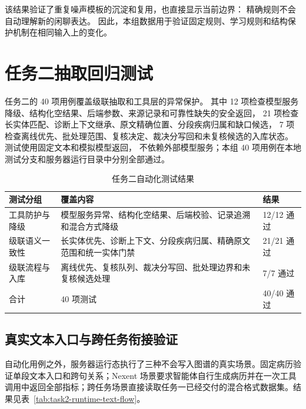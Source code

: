 该结果验证了重复噪声模板的沉淀和复用，也直接显示当前边界：
精确规则不会自动理解新的闲聊表达。
因此，本组数据用于验证固定规则、学习规则和结构保护机制在相同输入上的变化。

\section{任务二抽取回归测试}

任务二的 40 项用例覆盖级联抽取和工具层的异常保护。
其中 12 项检查模型服务降级、结构化空结果、后端参数、来源记录和可靠性缺失的安全返回，
21 项检查长实体匹配、诊断上下文继承、原文精确位置、分段疾病归属和缺口候选，
7 项检查离线优先、批处理范围、复核决定、裁决分写回和未复核候选的入库状态。
测试使用固定文本和模拟模型返回，
不依赖外部模型服务；本组 40 项用例在本地测试分支和服务器运行目录中分别全部通过。

\begin{table}[H]
\centering
\small
\caption{任务二自动化测试结果}
\label{tab:task2-test-results}
\begin{tabularx}{\textwidth}{L{3.0cm}Y C{2.0cm}}
\toprule
\textbf{测试分组} & \textbf{覆盖内容} & \textbf{结果} \\
\midrule
工具防护与降级 &
模型服务异常、结构化空结果、后端校验、记录追溯和混合方式降级 & 12/12 通过 \\
\addlinespace
级联语义一致性 &
长实体优先、诊断上下文、分段疾病归属、精确原文范围和统一实体门禁 & 21/21 通过 \\
\addlinespace
级联流程与入库 &
离线优先、复核队列、裁决分写回、批处理边界和未复核候选处理 & 7/7 通过 \\
\midrule
合计 & 40 项测试 & 40/40 通过 \\
\bottomrule
\end{tabularx}
\end{table}

\subsection{真实文本入口与跨任务衔接验证}

自动化用例之外，服务器运行态执行了三种不会写入图谱的真实场景。固定病历验证单段文本入口和跨句关系；Nexent 场景要求智能体自行生成病历并在一次工具调用中返回全部指标；跨任务场景直接读取任务一已经交付的混合格式数据集。结果见表~\ref{tab:task2-runtime-text-flow}。

